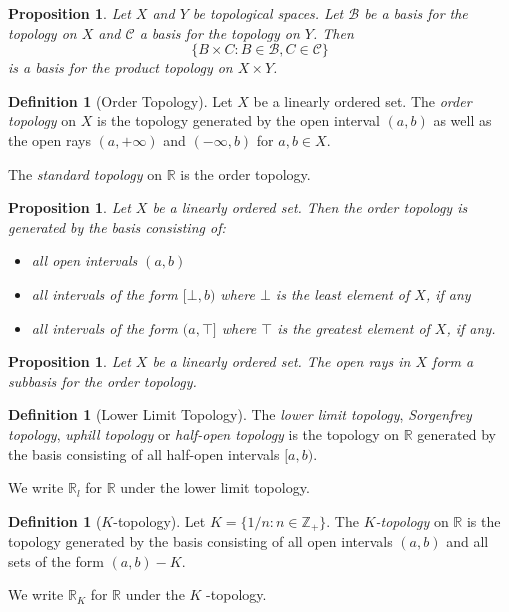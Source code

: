 \documentclass{book}
\newtheorem{prop}[ax]{Proposition}
\theoremstyle{definition}
\newtheorem{df}[ax]{Definition}
\begin{document}
\begin{prop}
Let $X$ and $Y$ be topological spaces. Let $\mathcal{B}$ be a basis for the topology on $X$ and $\mathcal{C}$ a basis for the topology on $Y$. Then
\[ \{ B \times C : B \in \mathcal{B}, C \in \mathcal{C} \} \]
is a basis for the product topology on $X \times Y$.
\end{prop}

\begin{df}[Order Topology]
Let $X$ be a linearly ordered set. The \emph{order topology} on $X$ is the topology generated by the open interval $(a,b)$ as well as the open rays $(a, + \infty)$ and $(-\infty, b)$ for $a,b \in X$.

The \emph{standard topology} on $\mathbb{R}$ is the order topology.
\end{df}

\begin{prop}
Let $X$ be a linearly ordered set. Then the order topology is generated by the basis consisting of:
\begin{itemize}
\item all open intervals $(a,b)$
\item all intervals of the form $[\bot, b)$ where $\bot$ is the least element of $X$, if any
\item all intervals of the form $(a, \top]$ where $\top$ is the greatest element of $X$, if any.
\end{itemize}
\end{prop}

\begin{prop}
Let $X$ be a linearly ordered set. The open rays in $X$ form a subbasis for the order topology.
\end{prop}

\begin{df}[Lower Limit Topology]
The \emph{lower limit topology}, \emph{Sorgenfrey topology}, \emph{uphill topology} or \emph{half-open topology} is the topology on $\mathbb{R}$ generated by the basis consisting of all half-open intervals $[a,b)$.

We write $\mathbb{R}_l$ for $\mathbb{R}$ under the lower limit topology.
\end{df}

\begin{df}[$K$-topology]
Let $K = \{ 1/n : n \in \mathbb{Z}_+ \}$. The \emph{$K$-topology} on $\mathbb{R}$ is the topology generated by the basis consisting of all open intervals $(a,b)$ and all sets of the form $(a,b) - K$.

We write $\mathbb{R}_K$ for $\mathbb{R}$ under the $K$ -topology.
\end{df}
\end{document}
